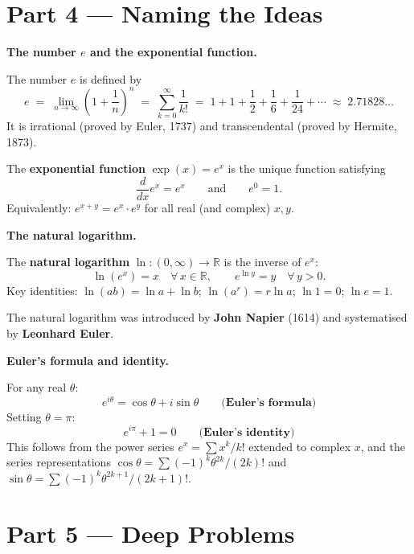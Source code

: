 \documentclass[12pt, a4paper]{article}
\begin{document}
\section{Part 4 \texorpdfstring{---}{--} Naming the Ideas}

\begin{namebox}
\textbf{The number $e$ and the exponential function.}

The number $e$ is defined by
\[
  e \;=\; \lim_{n\to\infty}\left(1+\frac{1}{n}\right)^n \;=\; \sum_{k=0}^{\infty}\frac{1}{k!} \;=\; 1 + 1 + \frac{1}{2} + \frac{1}{6} + \frac{1}{24} + \cdots \;\approx\; 2.71828\ldots
\]
It is irrational (proved by Euler, 1737) and transcendental (proved by Hermite, 1873).

\medskip
The \textbf{exponential function} $\exp(x) = e^x$ is the unique function satisfying
\[
  \frac{d}{dx}e^x = e^x \qquad \text{and} \qquad e^0 = 1.
\]
Equivalently: $e^{x+y} = e^x \cdot e^y$ for all real (and complex) $x, y$.
\end{namebox}

\begin{namebox}
\textbf{The natural logarithm.}

The \textbf{natural logarithm} $\ln : (0,\infty) \to \mathbb{R}$ is the inverse of $e^x$:
\[
  \ln(e^x) = x \quad \forall\, x \in \mathbb{R}, \qquad e^{\ln y} = y \quad \forall\, y > 0.
\]
Key identities: $\ln(ab) = \ln a + \ln b$; \quad $\ln(a^r) = r\ln a$; \quad $\ln 1 = 0$; \quad $\ln e = 1$.

The natural logarithm was introduced by \textbf{John Napier} (1614) and systematised by \textbf{Leonhard Euler}.
\end{namebox}

\begin{namebox}
\textbf{Euler's formula and identity.}

For any real $\theta$:
\[
  e^{i\theta} = \cos\theta + i\sin\theta \qquad \textbf{(Euler's formula)}
\]
Setting $\theta = \pi$:
\[
  e^{i\pi} + 1 = 0 \qquad \textbf{(Euler's identity)}
\]
This follows from the power series $e^x = \sum x^k/k!$ extended to complex $x$, and the series representations $\cos\theta = \sum(-1)^k\theta^{2k}/(2k)!$ and $\sin\theta = \sum(-1)^k\theta^{2k+1}/(2k+1)!$.
\end{namebox}

\section{Part 5 \texorpdfstring{---}{--} Deep Problems}
\end{document}
